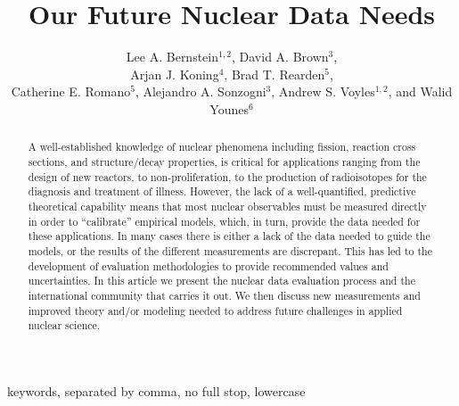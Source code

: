 \documentclass[letterpaper,draft]{ar-1col}
\begin{document}

\title{Our Future Nuclear Data Needs}


\author{Lee A. Bernstein$^{1,2}$, David A. Brown$^3$, \\Arjan J. Koning$^4$, Brad T. Rearden$^5$,  \\Catherine E. Romano$^5$, Alejandro A. Sonzogni$^3$, Andrew S. Voyles$^{1,2}$, and Walid  Younes$^6$
}

\begin{abstract}
A well-established knowledge of nuclear phenomena including fission, reaction cross sections, and structure/decay properties, is critical for applications ranging from the design of new reactors, to non-proliferation, to the production of radioisotopes for the diagnosis and treatment of illness.  However, the lack of a well-quantified, predictive theoretical capability means that most nuclear observables must be measured directly in order to \enquote{calibrate} empirical models, which, in turn, provide the data needed for these applications.  In many cases there is either a lack of the data needed to guide the models, or the results of the different measurements are discrepant.  This has led to the development of evaluation methodologies to provide recommended values and uncertainties.  In this article we present the nuclear data evaluation process and the international community that carries it out.  We then discuss new measurements and improved theory and/or modeling needed to address future challenges in applied nuclear science. 
\end{abstract}

\begin{keywords}
keywords, separated by comma, no full stop, lowercase
\end{keywords}
\maketitle
\end{document}
